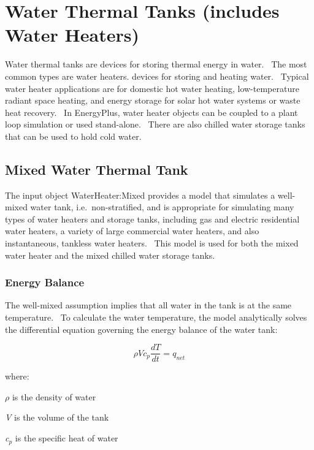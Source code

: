 \section{Water Thermal Tanks (includes Water Heaters) }\label{water-thermal-tanks-includes-water-heaters}

Water thermal tanks are devices for storing thermal energy in water.~ The most common types are water heaters. devices for storing and heating water.~ Typical water heater applications are for domestic hot water heating, low-temperature radiant space heating, and energy storage for solar hot water systems or waste heat recovery.~ In EnergyPlus, water heater objects can be coupled to a plant loop simulation or used stand-alone.~ There are also chilled water storage tanks that can be used to hold cold water.

\subsection{Mixed Water Thermal Tank}\label{mixed-water-thermal-tank}

The input object WaterHeater:Mixed provides a model that simulates a well-mixed water tank, i.e.~non-stratified, and is appropriate for simulating many types of water heaters and storage tanks, including gas and electric residential water heaters, a variety of large commercial water heaters, and also instantaneous, tankless water heaters.~ This model is used for both the mixed water heater and the mixed chilled water storage tanks.

\subsubsection{Energy Balance}\label{energy-balance}

The well-mixed assumption implies that all water in the tank is at the same temperature.~ To calculate the water temperature, the model analytically solves the differential equation governing the energy balance of the water tank:

\begin{equation}
\rho V{c_p}\frac{{dT}}{{dt}} = {q_{net}}
\end{equation}

where:

\emph{\(\rho\)} is the density of water

\emph{V} is the volume of the tank

\emph{c\(_{p}\)} is the specific heat of water

